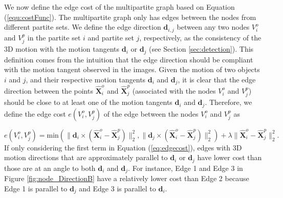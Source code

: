 We now define the edge cost of the multipartite graph based on Equation (\ref{equ:costFunc}).
The multipartite graph only has edges between the nodes from different partite sets.
We define the edge direction $\mathbf{d}_{i,j}$ between any two nodes $V_i^o$ and $V_j^p$ in the partite set $i$ and partite set $j$, respectively, as the consistency of the 3D motion with the motion tangents $\mathbf d_i$ or $\mathbf d_j$ (see Section  \ref{sec:detection}). This definition comes from the intuition that the edge direction should be compliant with the motion tangent observed in the images. Given the motion of two objects $i$ and $j$, and their respective motion tangents $\mathbf d_i$ and $\mathbf d_j$, it is clear that the edge direction between the points $\mathbf{\hat{X}}_i^o$ and $\mathbf{\hat{X}}_j^p$ (associated with the nodes $V_i^o$ and $V_j^p$) should be close to at least one of the motion tangents $\mathbf d_i$ and $\mathbf d_j$.
Therefore, we define the edge cost $e(V_i^o,V_j^p)$ of the edge between the nodes $V_i^o$ and $V_j^p$ as

\begin{equation}
\label{eq:edgecost}
e(V_i^o,V_j^p)=\text{min}(\|\mathbf{d}_i\times(\mathbf{\hat{X}}_i^{o}-\mathbf{\hat{X}}_j^{p})\|_2^2, \|\mathbf{d}_j\times(\mathbf{\hat{X}}_i^{o}-\mathbf{\hat{X}}_j^{p})\|_2^2) +\lambda\|\mathbf{\hat{X}}_i^{o}-\mathbf{\hat{X}}_j^{p}\|_2^2.
\end{equation}
If only considering the first term in Equation (\ref{eq:edgecost}), edges with 3D motion directions that are approximately parallel to $\mathbf{d}_i$ or $\mathbf{d}_j$ have lower  cost than those are at an angle to both $\mathbf{d}_i$ and $\mathbf{d}_j$. For instance, %
Edge 1 and Edge 3 in Figure \ref{fig:node_DirectionB} have a relatively lower cost than Edge 2 because Edge 1 is parallel to $\mathbf{d}_j$ and Edge 3 is parallel to $\mathbf{d}_i$.

